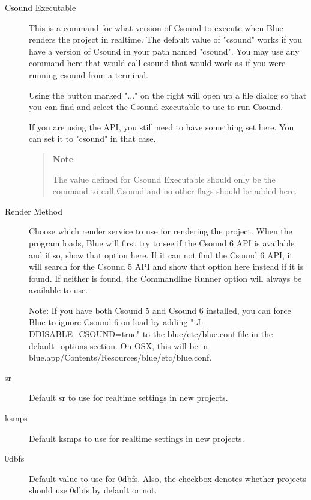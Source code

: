 \begin{description}
\item[Csound Executable]
This is a command for what version of Csound to execute when Blue
renders the project in realtime. The default value of "csound" works if
you have a version of Csound in your path named "csound". You may use
any command here that would call csound that would work as if you were
running csound from a terminal.

Using the button marked "..." on the right will open up a file dialog so
that you can find and select the Csound executable to use to run Csound.

If you are using the API, you still need to have something set here. You
can set it to "csound" in that case.

\begin{quote}
\textbf{Note}

The value defined for Csound Executable should only be the command to
call Csound and no other flags should be added here.
\end{quote}
\item[Render Method]
Choose which render service to use for rendering the project. When the
program loads, Blue will first try to see if the Csound 6 API is
available and if so, show that option here. If it can not find the
Csound 6 API, it will search for the Csound 5 API and show that option
here instead if it is found. If neither is found, the Commandline Runner
option will always be available to use.

Note: If you have both Csound 5 and Csound 6 installed, you can force
Blue to ignore Csound 6 on load by adding "-J-DDISABLE\_CSOUND=true" to
the blue/etc/blue.conf file in the default\_options section. On OSX,
this will be in blue.app/Contents/Resources/blue/etc/blue.conf.
\item[sr]
Default sr to use for realtime settings in new projects.
\item[ksmps]
Default ksmps to use for realtime settings in new projects.
\item[0dbfs]
Default value to use for 0dbfs. Also, the checkbox denotes whether
projects should use 0dbfs by default or not.
\end{description}

